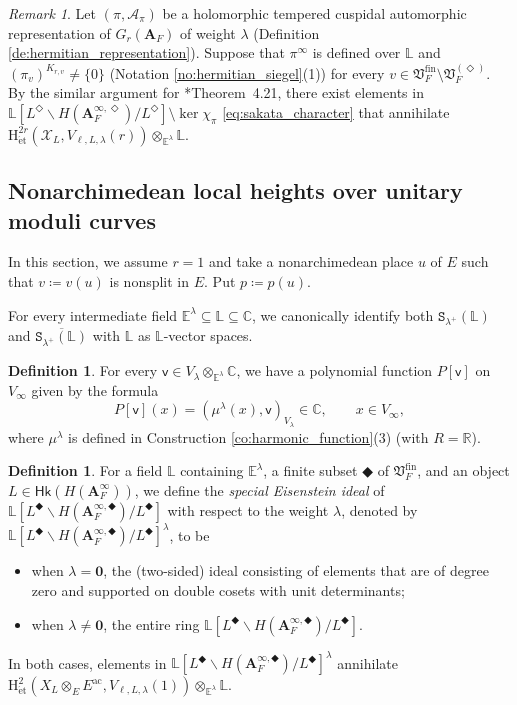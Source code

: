 \documentclass[12pt]{amsart}
\numberwithin{equation}{section}
\theoremstyle{plain}
\theoremstyle{definition}
\newtheorem{definition}[proposition]{Definition}
\theoremstyle{remark}
\newtheorem{remark}[proposition]{Remark}
\renewcommand{\b}[1]{\mathbf{#1}}
\renewcommand{\c}[1]{\mathcal{#1}}
\renewcommand{\d}[1]{\mathbb{#1}}
\newcommand{\f}[1]{\mathfrak{#1}}
\renewcommand{\r}[1]{\mathrm{#1}}
\renewcommand{\sf}[1]{\mathsf{#1}}
\renewcommand{\(}{\left(}
\renewcommand{\)}{\right)}
\newcommand{\ol}[1]{\overline{#1}{}}
\newcommand{\bA}{\b A}
\newcommand{\cA}{\c A}
\newcommand{\cX}{\c X}
\newcommand{\dC}{\d C}
\newcommand{\dE}{\d E}
\newcommand{\dL}{\d L}
\newcommand{\dR}{\d R}
\newcommand{\fV}{\f V}
\newcommand{\rH}{\r H}
\newcommand{\sfv}{\sf v}
\newcommand{\tS}{\mathtt{S}}
\newcommand{\ac}{\r{ac}}
\newcommand{\et}{{\acute{\r{e}}\r{t}}}
\newcommand{\fin}{\r{fin}}
\newcommand{\Hk}{\sf{Hk}}
\DeclareMathOperator{\Ker}{ker}
\begin{document}
\begin{remark}
Let $(\pi,\cA_\pi)$ be a holomorphic tempered cuspidal automorphic representation of $G_r(\bA_F)$ of weight $\lambda$ (Definition \ref{de:hermitian_representation}). Suppose that $\pi^\infty$ is defined over $\dL$ and $(\pi_v)^{K_{r,v}}\neq\{0\}$ (Notation \ref{no:hermitian_siegel}(1)) for every $v\in\fV_F^\fin\setminus\fV_F^{(\Diamond)}$. By the similar argument for \cite{LL22}*{Theorem~4.21}, there exist elements in $\dL[L^\Diamond\backslash H(\bA_F^{\infty,\Diamond})/L^\Diamond]\setminus\Ker\chi_\pi$ \eqref{eq:sakata_character} that annihilate $\rH^{2r}_{\et}(\cX_L,V_{\ell,L,\lambda}(r))\otimes_{\dE^\lambda}\dL$.
\end{remark}






\subsection{Nonarchimedean local heights over unitary moduli curves}
\label{ss:height_curve}


In this section, we assume $r=1$ and take a nonarchimedean place $u$ of $E$ such that $v\coloneqq v(u)$ is nonsplit in $E$. Put $p\coloneqq p(u)$.


For every intermediate field $\dE^\lambda\subseteq\dL\subseteq\dC$, we canonically identify both $\tS_{\lambda^+}(\dL)$ and $\ol{\tS_{\lambda^+}(\dL)}$ with $\dL$ as $\dL$-vector spaces.

\begin{definition}\label{de:schwartz_polynomial}
For every $\sfv\in V_\lambda\otimes_{\dE^\lambda}\dC$, we have a polynomial function $P[\sfv]$ on $V_\infty$ given by the formula
\[
P[\sfv](x)=(\mu^\lambda(x),\sfv)_{V_\lambda}\in\dC,\qquad x\in V_\infty,
\]
where $\mu^\lambda$ is defined in Construction \ref{co:harmonic_function}(3) (with $R=\dR$).
\end{definition}

\begin{definition}\label{de:eisenstein_ideal}
For a field $\dL$ containing $\dE^\lambda$, a finite subset $\Diamondblack$ of $\fV_F^\fin$, and an object $L\in\Hk(H(\bA_F^\infty))$, we define the \emph{special Eisenstein ideal} of $\dL[L^\Diamondblack\backslash H(\bA_F^{\infty,\Diamondblack})/L^\Diamondblack]$ with respect to the weight $\lambda$, denoted by $\dL[L^\Diamondblack\backslash H(\bA_F^{\infty,\Diamondblack})/L^\Diamondblack]^\lambda$, to be
\begin{itemize}
  \item when $\lambda=\b{0}$, the (two-sided) ideal consisting of elements that are of degree zero and supported on double cosets with unit determinants;

  \item when $\lambda\neq\b{0}$, the entire ring $\dL[L^\Diamondblack\backslash H(\bA_F^{\infty,\Diamondblack})/L^\Diamondblack]$.
\end{itemize}
In both cases, elements in $\dL[L^\Diamondblack\backslash H(\bA_F^{\infty,\Diamondblack})/L^\Diamondblack]^\lambda$ annihilate $\rH^2_{\et}(X_L\otimes_EE^\ac,V_{\ell,L,\lambda}(1))\otimes_{\dE^\lambda}\dL$.
\end{definition}
\end{document}
